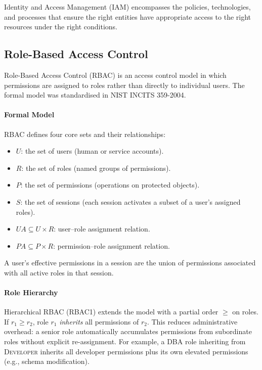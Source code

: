 Identity and Access Management (IAM) encompasses the policies, technologies, and processes that ensure the right entities have appropriate access to the right resources under the right conditions.

\subsection{Role-Based Access Control}

Role-Based Access Control (RBAC) is an access control model in which permissions are assigned to roles rather than directly to individual users. The formal model was standardised in NIST INCITS 359-2004.

\paragraph{Formal Model}

RBAC defines four core sets and their relationships:

\begin{itemize}
    \item $U$: the set of users (human or service accounts).
    \item $R$: the set of roles (named groups of permissions).
    \item $P$: the set of permissions (operations on protected objects).
    \item $S$: the set of sessions (each session activates a subset of a user's assigned roles).
    \item $UA \subseteq U \times R$: user–role assignment relation.
    \item $PA \subseteq P \times R$: permission–role assignment relation.
\end{itemize}

A user's effective permissions in a session are the union of permissions associated with all active roles in that session.

\paragraph{Role Hierarchy}

Hierarchical RBAC (RBAC1) extends the model with a partial order $\geq$ on roles. If $r_1 \geq r_2$, role $r_1$ \emph{inherits} all permissions of $r_2$. This reduces administrative overhead: a senior role automatically accumulates permissions from subordinate roles without explicit re-assignment. For example, a \textsc{DBA} role inheriting from \textsc{Developer} inherits all developer permissions plus its own elevated permissions (e.g., schema modification).

